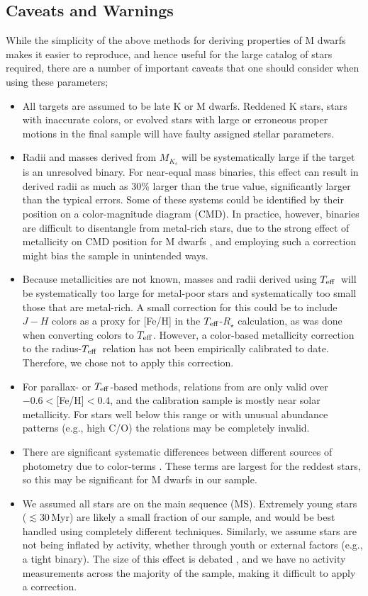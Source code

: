 \documentclass[twocolumn]{aastex62}
\newcommand{\teff}{$T_{\rm eff}$}
\begin{document}
\subsection{Caveats and Warnings}
While the simplicity of the above methods for deriving properties of M dwarfs makes it easier to reproduce, and hence useful for the large catalog of stars required, there are a number of important caveats that one should consider when using these parameters;
\begin{itemize}
    \item All targets are assumed to be late K or M dwarfs. Reddened K stars, stars with inaccurate colors, or evolved stars with large or erroneous proper motions in the final sample will have faulty assigned stellar parameters. 
    \item Radii and masses derived from $M_{K_s}$ will be systematically large if the target is an unresolved binary. For near-equal mass binaries, this effect can result in derived radii as much as 30\% larger than the true value, significantly larger than the typical errors. Some of these systems could be identified by their position on a color-magnitude diagram (CMD). In practice, however, binaries are difficult to disentangle from metal-rich stars, due to the strong effect of metallicity on CMD position for M dwarfs \citep{Johnson2009,Schlaufman2010,Neves2011}, and employing such a correction might bias the sample in unintended ways. 
    \item Because metallicities are not known, masses and radii derived using \teff\ will be systematically too large for metal-poor stars and systematically too small those that are metal-rich. A small correction for this could be to include $J-H$ colors as a proxy for [Fe/H] in the \teff-$R_\star$ calculation, as was done when converting colors to \teff. However, a color-based metallicity correction to the radius-\teff\ relation has not been empirically calibrated to date. Therefore, we chose not to apply this correction.
    \item For parallax- or \teff-based methods, relations from \citet{Mann2015} are only valid over $-0.6<$[Fe/H]$<0.4$, and the \citet{Benedict2016} calibration sample is mostly near solar metallicity. For stars well below this range or with unusual abundance patterns (e.g., high C/O) the relations may be completely invalid. 
    \item There are significant systematic differences between different sources of photometry due to color-terms \citep[][]{Bessell2012, Mann2015b}. These terms are largest for the reddest stars, so this may be significant for M dwarfs in our sample.
    \item We assumed all stars are on the main sequence (MS). Extremely young stars ($\lesssim30$\,Myr) are likely a small fraction of our sample, and would be best handled using completely different techniques. Similarly, we assume stars are not being inflated by activity, whether through youth or external factors (e.g., a tight binary). The size of this effect is debated \citep[e.g.,][]{Kraus2011,Stassun2012,Mann2015,Mann2017b}, and we have no activity measurements across the majority of the sample, making it difficult to apply a correction. 
\end{itemize}
\end{document}
